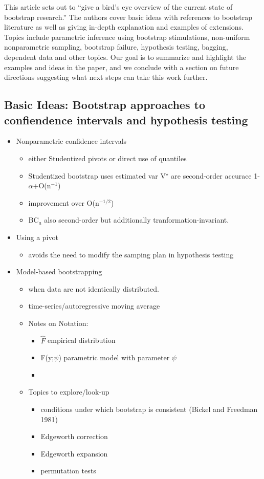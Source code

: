 \documentclass[11pt]{article}
\begin{document}
 
This article sets out to ``give a bird's eye overview of the current
state of bootstrap research.'' The authors cover basic ideas with
references to bootstrap literature as well as giving in-depth
explanation and examples of extensions. Topics include parametric
inference using bootstrap stimulations, non-uniform nonparametric
sampling, bootstrap failure, hypothesis testing, bagging, dependent
data and other topics. Our goal is to summarize and highlight the
examples and ideas in the paper, and we conclude with a section on
future directions suggesting what next steps can take this work further.
\subsection{Basic Ideas: Bootstrap approaches to confiendence intervals and hypothesis testing}
\label{sec-2-2}

 
\begin{itemize}
\item Nonparametric confidence intervals
\begin{itemize}
\item either Studentized pivots or direct use of quantiles
\item Studentized bootstrap uses estimated var V$^{\star}$ are second-order accurace 1-$\alpha$+O(n$^{\mathrm{-1}}$)
\item improvement over O(n$^{\mathrm{-1/2}}$)
\item BC$_a$ also second-order but additionally tranformation-invariant.
\end{itemize}
\item Using a pivot
\begin{itemize}
\item avoids the need to modify the samping plan in hypothesis testing
\end{itemize}
\item Model-based bootstrapping
\begin{itemize}
\item when data are not identically distributed.
\item time-series/autoregressive moving average
\item Notes on Notation:
\begin{itemize}
\item $\hat{F}$ empirical distribution
\item F(y;$\psi$) parametric model with parameter $\psi$
\item 
\end{itemize}
\item Topics to explore/look-up
\begin{itemize}
\item conditions under which bootstrap is consistent (Bickel and
    Freedman 1981)
\item Edgeworth correction
\item Edgeworth expansion
\item permutation tests
\end{itemize}
\end{itemize}
\end{itemize}
\end{document}
